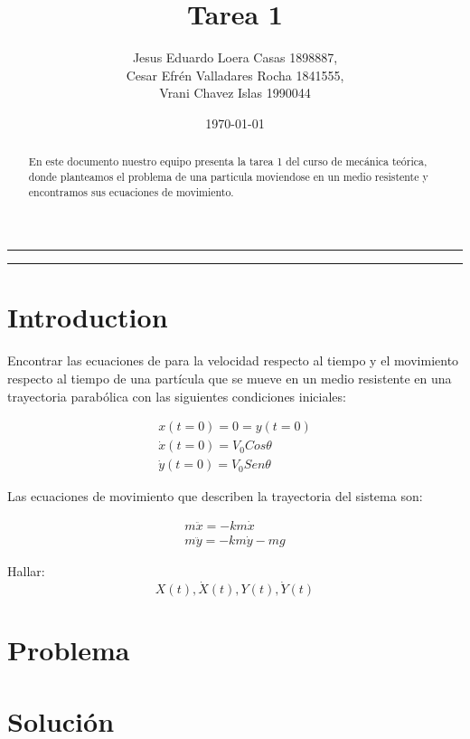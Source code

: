 \documentclass{article}
\title{Tarea 1}
\author{Jesus Eduardo Loera Casas 1898887,\\ Cesar Efrén Valladares Rocha 1841555,\\ Vrani Chavez Islas 1990044}
\date{\today}
\begin{document}


\tableofcontents			%

\begin{center}
	\rule[0mm]{150mm}{0.1mm}		%
	\end{center}
	
	
\begin{abstract}		%

	\noindent 				%
	En este documento nuestro equipo presenta la tarea 1 del curso de mecánica teórica, donde planteamos 
  el problema de una particula moviendose en un medio resistente y encontramos sus ecuaciones de 
  movimiento.
	\end{abstract}
	
\begin{center}
	\rule[0mm]{150mm}{0.1mm}
	\end{center}

\section{Introduction}		%
                            
  Encontrar las ecuaciones de para la velocidad respecto al tiempo y el movimiento respecto
  al tiempo de una partícula que se mueve en un medio resistente en una trayectoria parabólica 
  con las siguientes condiciones iniciales:

  \begin{gather*}
    x(t=0)=0=y(t=0) \\
    \dot{x} (t=0) = V_{0} Cos\theta \\
    \dot{y} (t=0) = V_{0} Sen\theta 
  \end{gather*}

  Las ecuaciones de movimiento que describen la trayectoria del sistema son:

  \begin{gather*}
    m\ddot{x} = -km\dot{x} \\
    m\ddot{y} = -km\dot{y}-mg
  \end{gather*}

  Hallar: $$ X(t), \dot{X} (t) , Y(t), \dot{Y} (t) $$

\section{Problema}

\section{Solución}

 

 
\end{document}
